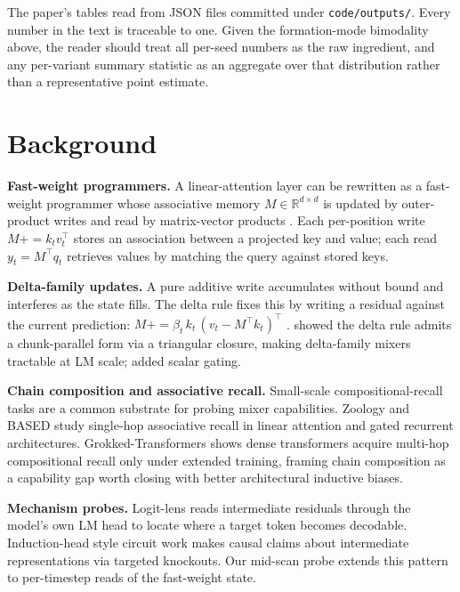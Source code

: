 \documentclass[11pt]{article}
\begin{document}
The paper's tables read from JSON files committed under
\texttt{code/outputs/}. Every number in the text is traceable to one.
Given the formation-mode bimodality above, the reader should treat all
per-seed numbers as the raw ingredient, and any per-variant summary
statistic as an aggregate over that distribution rather than a
representative point estimate.

\section{Background}
\label{sec:background}

\textbf{Fast-weight programmers.} A linear-attention layer can be
rewritten as a fast-weight programmer whose associative memory
$M \in \mathbb{R}^{d \times d}$ is updated by outer-product writes and
read by matrix-vector products \citep{schmidhuber1992fastweights,
schlag2021linear}. Each per-position write $M \mathrel{{+}{=}} k_t
v_t^{\top}$ stores an association between a projected key and value;
each read $y_t = M^{\top} q_t$ retrieves values by matching the query
against stored keys.

\textbf{Delta-family updates.} A pure additive write accumulates
without bound and interferes as the state fills. The delta rule fixes
this by writing a residual against the current prediction:
$M \mathrel{{+}{=}} \beta_t \, k_t \, (v_t - M^{\top} k_t)^{\top}$
\citep{schlag2021deltanet}. \citet{yang2024parallelizing} showed the
delta rule admits a chunk-parallel form via a triangular closure,
making delta-family mixers tractable at LM scale;
\citet{yang2024gated} added scalar gating.

\textbf{Chain composition and associative recall.} Small-scale
compositional-recall tasks are a common substrate for probing mixer
capabilities. Zoology and BASED
\citep{arora2023zoology,arora2024based} study single-hop associative
recall in linear attention and gated recurrent architectures.
Grokked-Transformers \citep{wang2024grokked} shows dense
transformers acquire multi-hop compositional recall only under
extended training, framing chain composition as a capability gap
worth closing with better architectural inductive biases.

\textbf{Mechanism probes.} Logit-lens
\citep{nostalgebraist2020logitlens} reads intermediate residuals
through the model's own LM head to locate where a target token
becomes decodable. Induction-head style circuit work
\citep{olsson2022incontext} makes causal claims about intermediate
representations via targeted knockouts. Our mid-scan probe extends
this pattern to per-timestep reads of the fast-weight state.
\end{document}
